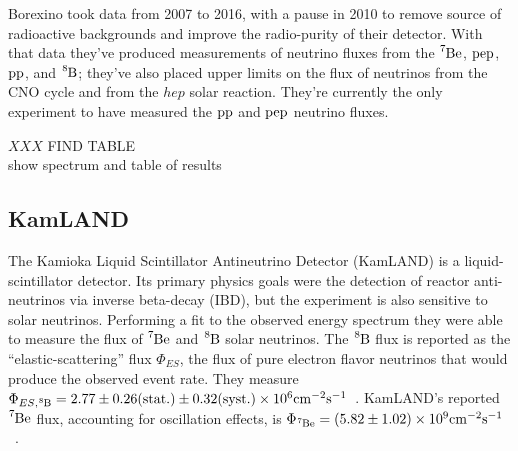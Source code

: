 Borexino took data from 2007 to 2016, with a pause in 2010 to remove source
of radioactive backgrounds and improve the radio-purity of their detector.
With that data they've produced measurements of neutrino fluxes from the $\ce{^{7}Be}$,
$\ce{pep}$, $\ce{pp}$, and $\ce{^{8}B}$; they've also placed upper limits on the flux
of neutrinos from the CNO cycle and from the $hep$ solar reaction.
They're currently the only experiment to have measured the $\ce{pp}$ and $\ce{pep}$ neutrino
fluxes.

$XXX$ FIND TABLE\\
show spectrum and table of results

\subsection{KamLAND}
The Kamioka Liquid Scintillator Antineutrino Detector (KamLAND) is a liquid-scintillator detector.
Its primary physics goals were the detection of reactor anti-neutrinos via
inverse beta-decay (IBD),
but the experiment is also sensitive to solar neutrinos.
Performing a fit to the observed energy spectrum they were able to measure
the flux of $\ce{^{7}Be}$ and $\ce{^{8}B}$ solar neutrinos.
The $\ce{^{8}B}$ flux is reported as the ``elastic-scattering'' flux $\Phi_{ES}$, the flux of
pure electron flavor neutrinos that would produce the observed event rate.
They measure $\Phi_{ES\mathrm{,}\ce{^{8}B}} = 2.77 \pm 0.26(\mathrm{stat.}) \pm 0.32(\mathrm{syst.}) \times 10^6 \mathrm{cm}^{-2}\mathrm{s}^{-1}$~\cite{kamland_b8}.
KamLAND's reported $\ce{^{7}Be}$ flux, accounting for oscillation effects,  is
 $\Phi_{\ce{^{7}Be}} = (5.82\pm 1.02)\times10^{9} \mathrm{cm}^{-2}\mathrm{s}^{-1}$~\cite{kamland_be7}.


